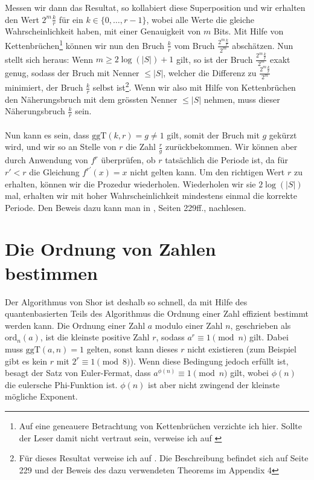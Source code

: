Messen wir dann das Resultat, so kollabiert diese Superposition und wir erhalten den Wert $2^m\frac{k}{r}$ für ein $k \in \{0, \dots, r - 1\}$, wobei alle Werte die gleiche Wahrscheinlichkeit haben, mit einer Genauigkeit von $m$ Bits. Mit Hilfe von Kettenbrüchen\footnote{Auf eine geneauere Betrachtung von Kettenbrüchen verzichte ich hier. Sollte der Leser damit nicht vertraut sein, verweise ich auf \cite{Frac}} können wir nun den Bruch $\frac{k}{r}$ vom Bruch $\frac{2^m\frac{k}{r}}{2^m}$ abschätzen. Nun stellt sich heraus: Wenn $m \geq 2\log(|S|) + 1$ gilt, so ist der Bruch $\frac{2^m\frac{k}{r}}{2^m}$ exakt genug, sodass der Bruch mit Nenner $\leq |S|$, welcher die Differenz zu $\frac{2^m\frac{k}{r}}{2^m}$ minimiert, der Bruch $\frac{k}{r}$ selbst ist\footnote{Für dieses Resultat verweise ich auf \cite{QC}. Die Beschreibung befindet sich auf Seite 229 und der Beweis des dazu verwendeten Theorems im Appendix 4}. Wenn wir also mit Hilfe von Kettenbrüchen den Näherungsbruch mit dem grössten Nenner $\leq |S|$ nehmen, muss dieser Näherungsbruch $\frac{k}{r}$ sein.
\paragraph{}
Nun kann es sein, dass $\text{ggT}(k, r) = g \neq 1$ gilt, somit der Bruch mit $g$ gekürzt wird, und wir so an Stelle von $r$ die Zahl $\frac{r}{g}$ zurückbekommen. Wir können aber durch Anwendung von $f^r$ überprüfen, ob $r$ tatsächlich die Periode ist, da für $r' < r$ die Gleichung $f^{r'}(x) = x$ nicht gelten kann. Um den richtigen Wert $r$ zu erhalten, können wir die Prozedur wiederholen. Wiederholen wir sie $2\log(|S|)$ mal, erhalten wir mit hoher Wahrscheinlichkeit mindestens einmal die korrekte Periode. Den Beweis dazu kann man in \cite{QC}, Seiten 229ff., nachlesen.

\section{Die Ordnung von Zahlen bestimmen}
Der Algorithmus von Shor ist deshalb so schnell, da mit Hilfe des quantenbasierten Teils des Algorithmus die Ordnung einer Zahl effizient bestimmt werden kann. Die Ordnung einer Zahl $a$ modulo einer Zahl $n$, geschrieben als $\text{ord}_n(a)$, ist die kleinste positive Zahl $r$, sodass $a^r \equiv 1 \pmod{n}$ gilt. Dabei muss $\text{ggT}(a, n) = 1$ gelten, sonst kann dieses $r$ nicht existieren (zum Beispiel gibt es kein $r$ mit $2^r \equiv 1 \pmod{8}$). Wenn diese Bedingung jedoch erfüllt ist, besagt der Satz von Euler-Fermat, dass $a^{\phi(n)} \equiv 1 \pmod{n}$ gilt, wobei $\phi(n)$ die eulersche Phi-Funktion ist. $\phi(n)$ ist aber nicht zwingend der kleinste mögliche Exponent. 


